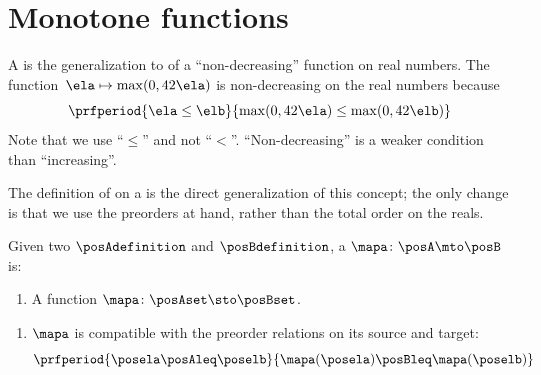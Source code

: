 
\section{Monotone functions}
\label{sec:monotonicity-monotone-maps}


A  is the generalization to  of a ``non-decreasing'' function on real numbers.
The function~$\ela \mapsto \max(0, 42 \ela)$ is non-decreasing on the real numbers because
\begin{equation}\label{eq:monotone-eq-1}
    \prfperiod{
        \ela \leq \elb
    }{
        \max(0, 42 \ela) \leq \max(0, 42 \elb)
    }
\end{equation}
Note that we use ``$\leq$'' and not ``$<$''.
``Non-decreasing'' is a weaker condition than ``increasing''.

The definition of  on a  is the direct generalization of this concept; the only change is that we use the preorders at hand, rather than the total order on the reals.

\begin{definition}
    \label{def:monotone}
    Given two  $\posAdefinition$ and $\posBdefinition$, a  $\mapa \colon \posA \mto \posB$ is:

    \constit
    \begin{enumerate}
        \item A function $\mapa \colon \posAset \sto \posBset$.
    \end{enumerate}

    \condit
    \begin{enumerate}
        \item $\mapa$ is compatible with the preorder relations on its source and target:
              \begin{equation}\label{eq:monotone-map-definition}
                  \prfperiod{
                      \posela \posAleq \poselb
                  }{
                      \mapa(\posela) \posBleq \mapa(\poselb)
                  }
              \end{equation}
    \end{enumerate}
\end{definition}

